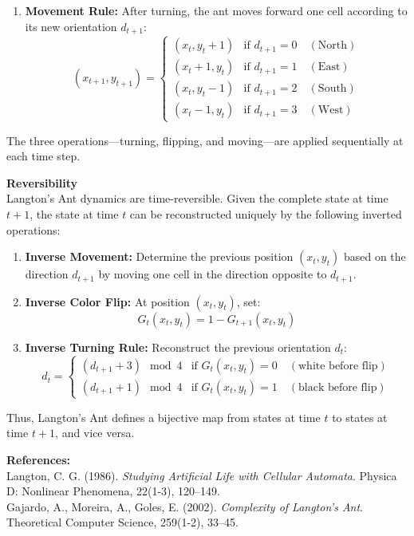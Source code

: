 \begin{technical}
\begin{enumerate}
\item \textbf{Movement Rule:}  
After turning, the ant moves forward one cell according to its new orientation $d_{t+1}$:
\[
(x_{t+1}, y_{t+1}) =
\begin{cases}
(x_t, y_t+1) & \text{if } d_{t+1} = 0 \quad (\text{North})\\
(x_t+1, y_t) & \text{if } d_{t+1} = 1 \quad (\text{East})\\
(x_t, y_t-1) & \text{if } d_{t+1} = 2 \quad (\text{South})\\
(x_t-1, y_t) & \text{if } d_{t+1} = 3 \quad (\text{West})
\end{cases}
\]
\end{enumerate}

The three operations—turning, flipping, and moving—are applied sequentially at each time step.

\textbf{Reversibility}\\[0.5em]
Langton's Ant dynamics are time-reversible. Given the complete state at time $t+1$, the state at time $t$ can be reconstructed uniquely by the following inverted operations:
\begin{enumerate}
\item \textbf{Inverse Movement:}  
Determine the previous position $(x_t, y_t)$ based on the direction $d_{t+1}$ by moving one cell in the direction opposite to $d_{t+1}$.

\item \textbf{Inverse Color Flip:}  
At position $(x_t, y_t)$, set:
\[
G_t(x_t, y_t) = 1 - G_{t+1}(x_t, y_t)
\]

\item \textbf{Inverse Turning Rule:}  
Reconstruct the previous orientation $d_t$:
\[
d_t =
\begin{cases}
(d_{t+1} + 3) \mod 4 & \text{if } G_t(x_t, y_t) = 0 \quad (\text{white before flip})\\
(d_{t+1} + 1) \mod 4 & \text{if } G_t(x_t, y_t) = 1 \quad (\text{black before flip})
\end{cases}
\]
\end{enumerate}

Thus, Langton’s Ant defines a bijective map from states at time $t$ to states at time $t+1$, and vice versa.

\vspace{0.5em}
\textbf{References:}\\[0.5em]
Langton, C. G. (1986). \textit{Studying Artificial Life with Cellular Automata}. Physica D: Nonlinear Phenomena, 22(1-3), 120–149.\\
Gajardo, A., Moreira, A., Goles, E. (2002). \textit{Complexity of Langton’s Ant}. Theoretical Computer Science, 259(1-2), 33–45.
\end{technical}
